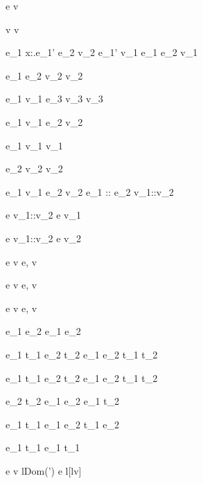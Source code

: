  {e  \eval v}


  {}
  {v  \eval v}

  {e_1 \eval \lambda x:\tau.e_1' \Quad
   e_2 \eval v_2 \Quad
   [x \mapsto v_2]e_1' \eval v_1}
  {e_1 e_2 \eval v_1}


  {e_1 \eval \True \Quad
   e_2 \eval v_2}
  { \eval v_2}

  {e_1 \eval v_1 \Quad
   e_3 \eval v_3}
  { \eval v_3}


  {e_1 \eval v_1 \Quad
   e_2 \eval v_2}
  { \eval {}}

  {e_1 \eval v_1}
  {\Fst {} \eval v_1}

  {e_2 \eval v_2}
  {\Snd {} \eval v_2 }


  {e_1 \eval v_1 \Quad
   e_2 \eval v_2}
  {e_1 :: e_2 \eval v_1::v_2}

  {e \eval v_1::v_2}
  {\Head e \eval v_1}

{e \eval v_1::v_2}
{\Tail e \eval v_2}



  {e \eval v}
  {\Done e, \sigma \eval \Done v}

  {}
  {\Enter \beta \eval \Enter \beta}

  {e \eval v}
  {\Update e, \sigma \eval \Update v}

  {e \eval v}
  {\View e, \sigma \eval \View v}

  {}
  {e_1 \Pick e_2 \eval e_1 \Pick e_2}


  {e_1 \eval t_1 \Quad
   e_2 \eval t_2}
  {e_1 \Pair e_2 \eval t_1 \Pair t_2}

  {e_1 \eval t_1 \Quad
   e_2 \eval t_2}
  {e_1 \Choose e_2 \eval t_1 \Choose t_2}

  {}
  {\Fail \eval \Fail}


  {e_2 \eval t_2}
  {e_1 \Trans e_2 \eval e_1 \Trans t_2}

  {e_1 \eval t_1}
  {e_1 \Step e_2 \eval t_1 \Step e_2}

  {e_1 \eval t_1}
  {\Forever e_1 \eval \Forever t_1}


  {e \eval v \Quad
   l\not\in Dom(\sigma')}
  {\Share e \eval l[l\mapsto v]}

